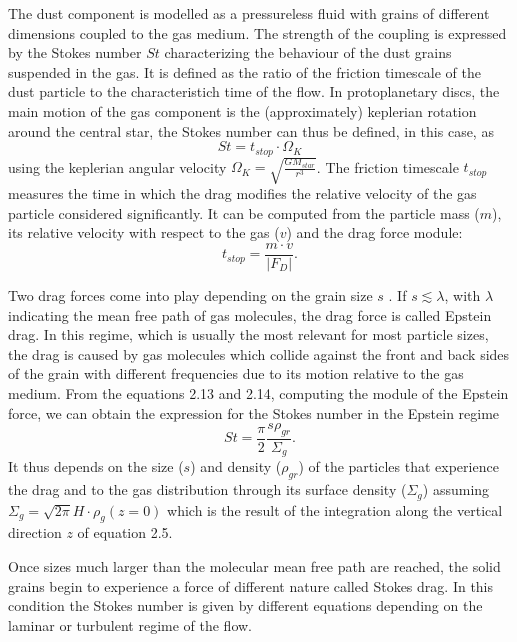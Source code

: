 \documentclass[a4paper,10pt]{report}
\begin{document}
The dust component is modelled as a pressureless fluid with grains of different dimensions coupled to the gas medium. 
The strength of the coupling is expressed by the Stokes number $St$ characterizing the behaviour of
the dust grains suspended in the gas.
It is defined as the ratio of the friction timescale of the dust particle to the characteristich time of the flow.
In protoplanetary discs, the main motion of the gas component is the (approximately)
keplerian rotation around the central star, the Stokes number can thus be defined, in this case,
as 
\begin{equation}
    St = t_{stop} \cdot \Omega_K
\end{equation}
using the keplerian angular velocity $\Omega_K = \sqrt{\frac{GM_{star}}{r^3}}$.
The friction timescale $t_{stop}$ measures the time in which the drag modifies the relative velocity of the 
gas particle considered significantly. It can be computed from the particle mass ($m$), 
its relative velocity with respect to the gas ($v$)
and the drag force module:
\begin{equation}
    t_{stop} = \frac{m\cdot v}{|F_D|}.
\end{equation}

Two drag forces come into play depending on the grain size $s$ \citep[pp. 110,111]{book_planet_form}. 
If $s \lesssim \lambda$, with $\lambda$ indicating the mean free path of gas molecules, 
the drag force is called Epstein drag. 
In this regime, which is usually the most relevant for most particle sizes, 
the drag is caused by gas molecules which collide against the front and back sides of the grain with different 
frequencies due to its motion relative to the gas medium.
From the equations 2.13 and 2.14, computing the module of the Epstein force, we can obtain the expression 
for the Stokes number in the Epstein regime 
\begin{equation}
    St = \frac{\pi}{2}\frac{s\rho_{gr}}{\Sigma_g}.
\end{equation}
It thus depends on the size ($s$)
and density ($\rho_{gr}$) of the particles that experience the drag
and to the gas distribution through its
surface density ($\Sigma_g$) assuming 
$\Sigma_g = \sqrt{2\pi}H\cdot \rho_g(z=0)$ which is the result of the integration
along the vertical direction $z$ of equation 2.5.

Once sizes much larger than the molecular 
mean free path are reached, the solid grains begin to experience a force of different nature called Stokes drag.
In this condition the Stokes number is given by different
equations depending on the laminar or turbulent regime
of the flow.
\end{document}
